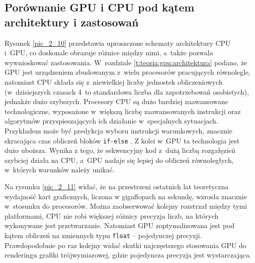 		\subsection{Porównanie GPU i CPU pod kątem architektury i zastosowań}
		\label{t:teoria:gpu:porownanie}
		
		
		Rysunek \ref{pic_2_10} przedstawia uproszczone schematy architektury CPU i~GPU, co doskonale obrazuje różnice między nimi, a~także pozwala wywnioskować zastosowania. W~rozdziale \ref{t:teoria:gpu:architektura} podano, że GPU jest urządzeniem zbudowanym z~wielu procesorów pracujących równolegle, natomiast CPU składa się z~niewielkiej liczby jednostek obliczeniowych (w~dzisiejszych czasach 4~to standardowa liczba dla zapotrzebowań osobistych), jednakże dużo szybszych. Procesory CPU są dużo bardziej zaawansowane technologiczne, wyposażone w~większą liczbę zaawansowanych instrukcji oraz algorytmów przyspieszających ich działanie w~specjalnych sytuacjach. Przykładem może być predykcja wyboru instrukcji warunkowych, znacznie skracająca czas obliczeń bloków \texttt{if-else} \cite{branch_prediction_wiki}. Z kolei w~GPU ta technologia jest dużo uboższa. Wynika z tego, że sekwencyjny kod z~dużą liczbą rozgałęzień szybciej działa na CPU, a~GPU nadaje się lepiej do obliczeń równoległych, w~których warunków należy unikać. 
		
		
		Na rysunku \ref{pic_2_11} widać, że na przestrzeni ostatnich lat teoretyczna wydajność kart graficznych, liczona w gigaflopach na sekundę, wzrosła znacznie w~stosunku do procesorów. Można zaobserwować kolejny rozstrzał między tymi platformami, CPU nie robi większej różnicy precyzja liczb, na których wykonywane jest przetwarzanie. Natomiast GPU zoptymalizowana jest pod kątem obliczeń na zmiennych typu \texttt{float} -- pojedynczej precyzji. Prawdopodobnie po raz kolejny widać skutki najczęstszego stosowania GPU do renderingu grafiki trójwymiarowej, gdzie pojedyncza precyzja jest wystarczająca.
		
